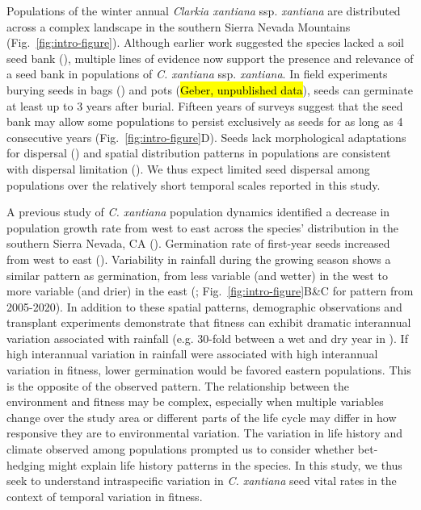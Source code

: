 \documentclass[12pt, oneside, titlepage]{article}   	%
\begin{document}
Populations of the winter annual \textit{Clarkia xantiana} ssp. \textit{xantiana} are distributed across a complex landscape in the southern Sierra Nevada Mountains (Fig.~\ref{fig:intro-figure}). Although earlier work suggested the species lacked a soil seed bank (\cite{lewis1962}), multiple lines of evidence now support the presence and relevance of a seed bank in populations of \textit{C. xantiana} ssp. \textit{xantiana}. In field experiments burying seeds in bags (\cite{eckhart2011}) and pots (\hl{Geber, unpublished data}), seeds can germinate at least up to 3 years after burial. Fifteen years of surveys suggest that the seed bank may allow some populations to persist exclusively as seeds for as long as 4 consecutive years (Fig.~\ref{fig:intro-figure}D). Seeds lack morphological adaptations for dispersal (\cite{knies2004}) and spatial distribution patterns in populations are consistent with dispersal limitation (\cite{kramer2011}). We thus expect limited seed dispersal among populations over the relatively short temporal scales reported in this study.

A previous study of \textit{C. xantiana} population dynamics identified a decrease in population growth rate from west to east across the species' distribution in the southern Sierra Nevada, CA (\cite{eckhart2011}). Germination rate of first-year seeds increased from west to east (\cite{eckhart2011}). Variability in rainfall during the growing season shows a similar pattern as germination, from less variable (and wetter) in the west to more variable (and drier) in the east (\cite{eckhart2011}; Fig.~\ref{fig:intro-figure}B\&C for pattern from 2005-2020). In addition to these spatial patterns, demographic observations \cite{eckhart2011} and transplant experiments demonstrate that fitness can exhibit dramatic interannual variation associated with rainfall (e.g. 30-fold between a wet and dry year in \cite{geber2005}). If high interannual variation in rainfall were associated with high interannual variation in fitness, lower germination would be favored eastern populations. This is the opposite of the observed pattern. The relationship between the environment and fitness may be complex, especially when multiple variables change over the study area or different parts of the life cycle may differ in how responsive they are to environmental variation. The variation in life history and climate observed among populations prompted us to consider whether bet-hedging might explain life history patterns in the species. In this study, we thus seek to understand intraspecific variation in \textit{C. xantiana} seed vital rates in the context of temporal variation in fitness.
\end{document}
